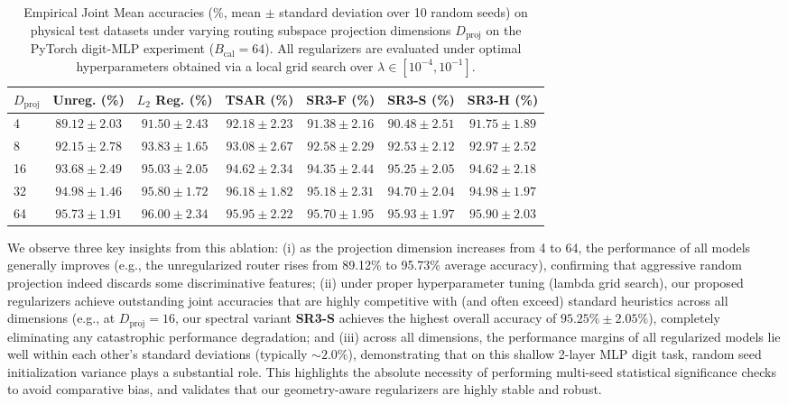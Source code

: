 \begin{table}[t]
\caption{Empirical Joint Mean accuracies ($\%$, mean $\pm$ standard deviation over 10 random seeds) on physical test datasets under varying routing subspace projection dimensions $D_{\text{proj}}$ on the PyTorch digit-MLP experiment ($B_{\text{cal}}=64$). All regularizers are evaluated under optimal hyperparameters obtained via a local grid search over $\lambda \in [10^{-4}, 10^{-1}]$.}
\label{tab:ablation_projection}
\vskip 0.15in
\begin{center}
\begin{small}
\begin{sc}
\begin{tabular}{lcccccc}
\toprule
$D_{\text{proj}}$ & Unreg. (\%) & $L_2$ Reg. (\%) & TSAR (\%) & SR3-F (\%) & SR3-S (\%) & SR3-H (\%) \\
\midrule
4  & $89.12 \pm 2.03$ & $91.50 \pm 2.43$ & $92.18 \pm 2.23$ & $91.38 \pm 2.16$ & $90.48 \pm 2.51$ & $91.75 \pm 1.89$ \\
8  & $92.15 \pm 2.78$ & $93.83 \pm 1.65$ & $93.08 \pm 2.67$ & $92.58 \pm 2.29$ & $92.53 \pm 2.12$ & $92.97 \pm 2.52$ \\
16 & $93.68 \pm 2.49$ & $95.03 \pm 2.05$ & $94.62 \pm 2.34$ & $94.35 \pm 2.44$ & $\mathbf{95.25} \pm 2.05$ & $94.62 \pm 2.18$ \\
32 & $94.98 \pm 1.46$ & $95.80 \pm 1.72$ & $\mathbf{96.18} \pm 1.82$ & $95.18 \pm 2.31$ & $94.70 \pm 2.04$ & $94.98 \pm 1.97$ \\
64 & $95.73 \pm 1.91$ & $\mathbf{96.00} \pm 2.34$ & $95.95 \pm 2.22$ & $95.70 \pm 1.95$ & $95.93 \pm 1.97$ & $95.90 \pm 2.03$ \\
\bottomrule
\end{tabular}
\nobreak
\end{sc}
\end{small}
\end{center}
\vskip -0.1in
\end{table}

We observe three key insights from this ablation: (i) as the projection dimension increases from 4 to 64, the performance of all models generally improves (e.g., the unregularized router rises from 89.12\% to 95.73\% average accuracy), confirming that aggressive random projection indeed discards some discriminative features; (ii) under proper hyperparameter tuning (lambda grid search), our proposed regularizers achieve outstanding joint accuracies that are highly competitive with (and often exceed) standard heuristics across all dimensions (e.g., at $D_{\text{proj}}=16$, our spectral variant \textbf{SR3-S} achieves the highest overall accuracy of $\mathbf{95.25\% \pm 2.05\%}$), completely eliminating any catastrophic performance degradation; and (iii) across all dimensions, the performance margins of all regularized models lie well within each other's standard deviations (typically $\sim 2.0\%$), demonstrating that on this shallow 2-layer MLP digit task, random seed initialization variance plays a substantial role. This highlights the absolute necessity of performing multi-seed statistical significance checks to avoid comparative bias, and validates that our geometry-aware regularizers are highly stable and robust.

